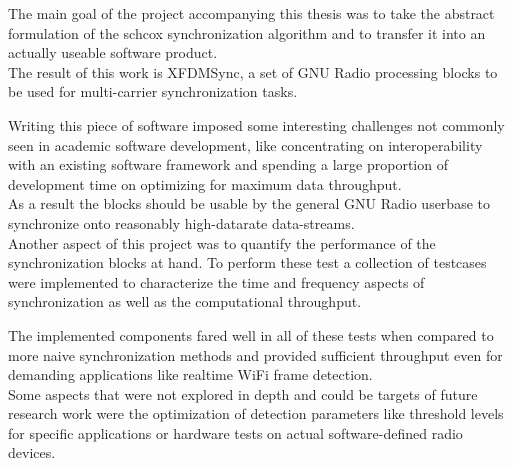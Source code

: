 The main goal of the project accompanying this thesis was
to take the abstract formulation of the \acrlong{schcox}
synchronization algorithm and to transfer it into an actually
useable software product. \\

The result of this work is XFDMSync\cite{xfdmsyncweb},
a set of GNU Radio processing blocks to be used for multi-carrier
synchronization tasks.

Writing this piece of software imposed some interesting
challenges not commonly seen in academic software development,
like concentrating on interoperability with an existing
software framework and spending a large proportion of
development time on optimizing for maximum data throughput. \\

As a result the blocks should be usable
by the general GNU Radio userbase to synchronize onto
reasonably high-datarate data-streams. \\

Another aspect of this project was to quantify
the performance of the synchronization blocks at hand.
To perform these test a collection of testcases
were implemented to characterize the
time and frequency aspects of synchronization as
well as the computational throughput.

The implemented components fared well in all of these tests
when compared to more naive synchronization
methods and provided sufficient throughput
even for demanding applications like realtime WiFi frame
detection. \\

Some aspects that were not explored in depth
and could be targets of future research work
were the optimization of detection parameters
like threshold levels for specific applications
or hardware tests on actual software-defined radio
devices.

